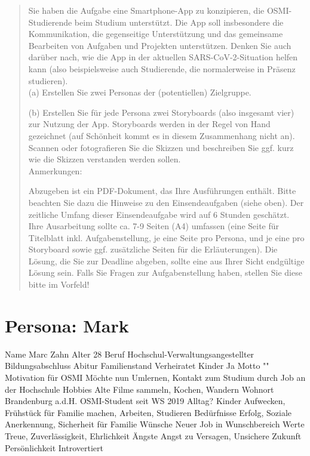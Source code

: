 \documentclass{article}
\begin{document}
\begin{quote}
	Sie haben die Aufgabe eine Smartphone-App zu konzipieren, die OSMI-Studierende beim Studium unterstützt.
	Die App soll insbesondere die Kommunikation, die gegenseitige Unterstützung und das gemeinsame Bearbeiten
	von Aufgaben und Projekten unterstützen. Denken Sie auch darüber nach, wie die App in der aktuellen
	SARS-CoV-2-Situation helfen kann (also beispielsweise auch Studierende, die normalerweise in Präsenz studieren).
	\\[1em]
	(a) Erstellen Sie zwei Personas der (potentiellen) Zielgruppe.

	(b) Erstellen Sie für jede Persona zwei Storyboards (also insgesamt vier) zur Nutzung der App. Storyboards
	werden in der Regel von Hand gezeichnet (auf Schönheit kommt es in diesem Zusammenhang nicht an). Scannen
	oder fotografieren Sie die Skizzen und beschreiben Sie ggf. kurz wie die Skizzen verstanden werden sollen.
	\\[1em]
	Anmerkungen:

	Abzugeben ist ein PDF-Dokument, das Ihre Ausführungen enthält. Bitte beachten Sie dazu die Hinweise zu den
	Einsendeaufgaben (siehe oben). Der zeitliche Umfang dieser Einsendeaufgabe wird auf 6 Stunden geschätzt.
	Ihre Ausarbeitung sollte ca. 7-9 Seiten (A4) umfassen (eine Seite für Titelblatt inkl. Aufgabenstellung,
	je eine Seite pro Persona, und je eine pro Storyboard sowie ggf. zusätzliche Seiten für die Erläuterungen).
	Die Lösung, die Sie zur Deadline abgeben, sollte eine aus Ihrer Sicht endgültige Lösung sein. Falls Sie
	Fragen zur Aufgabenstellung haben, stellen Sie diese bitte im Vorfeld!
\end{quote}

\newpage

\section{Persona: Mark}

Name					Marc Zahn
Alter					28
Beruf					Hochschul-Verwaltungsangestellter
Bildungsabschluss		Abitur
Familienstand			Verheiratet
Kinder					Ja
Motto					""
Motivation für OSMI		Möchte nun Umlernen, Kontakt zum Studium durch Job an der Hochschule
Hobbies					Alte Filme sammeln, Kochen, Wandern
Wohnort					Brandenburg a.d.H.
OSMI-Student seit		WS 2019
Alltag?					Kinder Aufwecken, Frühstück für Familie machen, Arbeiten, Studieren
Bedürfnisse				Erfolg, Soziale Anerkennung, Sicherheit für Familie
Wünsche					Neuer Job in Wunschbereich
Werte					Treue, Zuverlässigkeit, Ehrlichkeit
Ängste					Angst zu Versagen, Unsichere Zukunft
Persönlichkeit			Introvertiert
\end{document}
